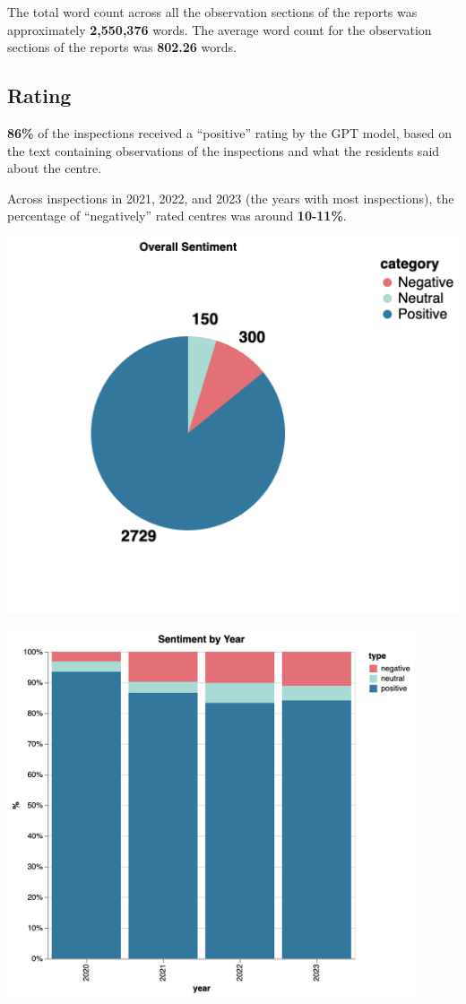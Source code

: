 \documentclass[a4paper,11pt,twoside]{article}
\begin{document}
The total word count across all the observation sections of the reports was approximately \textbf{2,550,376} words. The average word count for the observation sections of the reports was \textbf{802.26} words.
\subsection{Rating}
\label{sec:org4eddb74}

\textbf{86\%} of the inspections received a ``positive'' rating by the GPT model, based on the text containing observations of the inspections and what the residents said about the centre.

Across inspections in 2021, 2022, and 2023 (the years with most inspections), the percentage of ``negatively'' rated centres was around \textbf{10-11\%}.

\begin{center}
\includegraphics[width=.9\linewidth]{img/14_rating_pie.png}
\end{center}

\begin{center}
\includegraphics[width=12cm]{img/15_rating_year.png}
\end{center}
\end{document}

